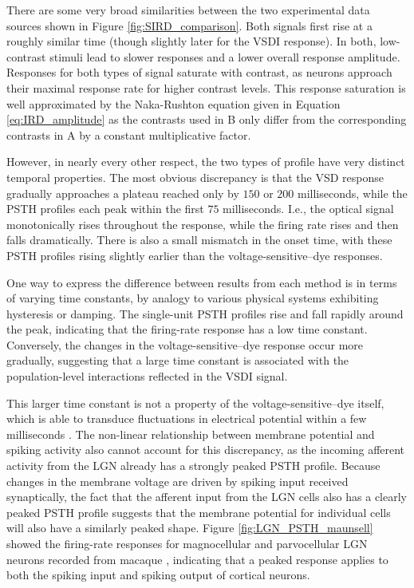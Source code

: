 \documentclass[phd,ianc,twoside]{infthesis}
\begin{document}
There are some very broad similarities between the two experimental
data sources shown in Figure \ref{fig:SIRD_comparison}. Both
signals first rise at a roughly similar time (though slightly later
for the VSDI response). In both, low-contrast stimuli
lead to slower responses and a lower overall response amplitude.
Responses for both types of signal saturate with contrast, as
neurons approach their maximal response rate for higher contrast
levels. This response saturation is well approximated by the
Naka-Rushton equation given in Equation \ref{eq:IRD_amplitude}
as the contrasts used in B only differ from the corresponding contrasts in
A by a constant multiplicative factor.

However, in nearly every other respect, the two types of profile have
very distinct temporal properties.  The most obvious discrepancy is that
the VSD response gradually approaches a plateau reached only by $150$ or
$200$ milliseconds, while the PSTH profiles each peak within the
first $75$ milliseconds. I.e., the optical signal monotonically rises
throughout the response, while the firing rate rises and then falls
dramatically. There is also a small mismatch in the onset time, with
these PSTH profiles rising slightly earlier than the
voltage-sensitive--dye responses.

One way to express the difference between results from each method is
in terms of varying time constants, by analogy to various
physical systems exhibiting hysteresis or damping. The single-unit PSTH
profiles rise and fall rapidly around the peak, indicating that the
firing-rate response has a low time constant. Conversely, the changes
in the voltage-sensitive--dye response occur more gradually, suggesting
that a large time constant is associated with the population-level
interactions reflected in the VSDI signal.

This larger time constant is not a property of the voltage-sensitive--dye
itself, which is able to transduce fluctuations in electrical potential
within a few milliseconds \citep{chemla_jphys10}. The non-linear
relationship between membrane potential and spiking activity also cannot
account for this discrepancy, as the incoming afferent activity from the
LGN already has a strongly peaked PSTH profile. Because changes in the membrane
voltage are driven by spiking input received synaptically, the fact
that the afferent input from the LGN cells also has a clearly peaked PSTH
profile suggests that the membrane potential for individual cells will
also have a similarly peaked shape. Figure \ref{fig:LGN_PSTH_maunsell} showed the firing-rate
responses for magnocellular and parvocellular LGN neurons recorded from
macaque \citep{maunsell_visneuro99}, indicating that a peaked response
applies to both the spiking input and spiking output of cortical neurons.
\end{document}
